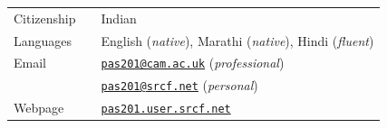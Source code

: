 \documentclass[10pt]{article}
\newcommand{\nextItem}{\\[0.25em]}
\begin{document}
\begin{longtable}{>{\raggedleft\arraybackslash}p{0.82in}>{}p{0.05in}>{}p{5.5in}}
    Citizenship
     &  & Indian\nextItem%
    Languages
     &  & English (\emph{native}), Marathi (\emph{native}),
    Hindi (\emph{fluent}) \nextItem%
    Email
     &  & \href{mailto:pas201@cam.ac.uk}{\texttt{pas201@cam.ac.uk}}
    (\emph{professional})\nextItem%
     &  & \href{mailto:pas201@srcf.net}{\texttt{pas201@srcf.net}}
    (\emph{personal})\nextItem%

    Webpage
     &  &
    \href{https://pas201.user.srcf.net}{\texttt{pas201.user.srcf.net}}\nextItem%
\end{longtable}
\end{document}
